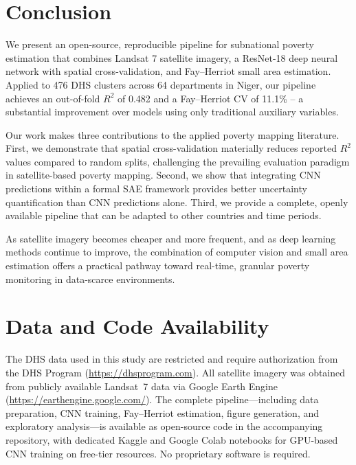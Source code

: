 \documentclass[11pt,a4paper]{article}
\newcommand{\Rtwo}{\ensuremath{R^2}}
\begin{document}
\section{Conclusion}
\label{sec:conclusion}

We present an open-source, reproducible pipeline for subnational poverty estimation that combines Landsat 7 satellite imagery, a ResNet-18 deep neural network with spatial cross-validation, and Fay--Herriot small area estimation. Applied to 476 DHS clusters across 64 departments in Niger, our pipeline achieves an out-of-fold \Rtwo{} of 0.482 and a Fay--Herriot CV of 11.1\% -- a substantial improvement over models using only traditional auxiliary variables.

Our work makes three contributions to the applied poverty mapping literature. First, we demonstrate that spatial cross-validation materially reduces reported \Rtwo{} values compared to random splits, challenging the prevailing evaluation paradigm in satellite-based poverty mapping. Second, we show that integrating CNN predictions within a formal SAE framework provides better uncertainty quantification than CNN predictions alone. Third, we provide a complete, openly available pipeline that can be adapted to other countries and time periods.

As satellite imagery becomes cheaper and more frequent, and as deep learning methods continue to improve, the combination of computer vision and small area estimation offers a practical pathway toward real-time, granular poverty monitoring in data-scarce environments.

\section*{Data and Code Availability}

The DHS data used in this study are restricted and require authorization from the DHS Program (\url{https://dhsprogram.com}). All satellite imagery was obtained from publicly available Landsat~7 data via Google Earth Engine (\url{https://earthengine.google.com/}). The complete pipeline---including data preparation, CNN training, Fay--Herriot estimation, figure generation, and exploratory analysis---is available as open-source code in the accompanying repository, with dedicated Kaggle and Google Colab notebooks for GPU-based CNN training on free-tier resources. No proprietary software is required.
\end{document}
